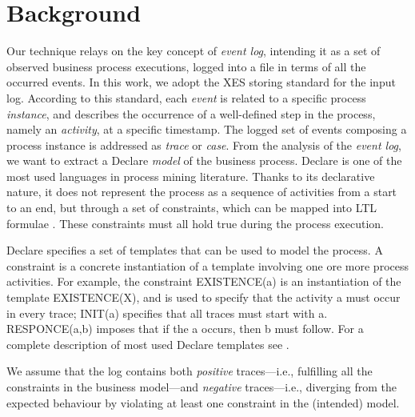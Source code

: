 \section{Background}%
\label{sec:back}

Our technique relays on the key concept of \emph{event log}, intending it as a set of observed business process executions, logged into a file in terms of all the occurred events. In this work, we adopt the \ac{XES} storing standard \cite{XES} for the input log. According to this standard, each \emph{event} is related to a specific process \emph{instance}, and describes the occurrence of a well-defined step in the process, namely an \emph{activity}, at a specific timestamp. The logged set of events composing a process instance is addressed as \emph{trace} or \emph{case}. 
From the analysis of the \emph{event log}, we want to extract a Declare \cite{2008-Pesic,2009-Aalst} \emph{model} of the business process.
Declare is one of the most used languages in process mining literature. Thanks to its declarative nature, it does not represent the process as a sequence of activities from a start to an end, but through a set of constraints, which can be mapped into \ac{LTL} formulae \cite{?}. These constraints must all hold true during the process execution.

Declare specifies a set of templates that can be used to model the process. 
A constraint is a concrete instantiation of a template involving one ore more process activities.
For example, the constraint \textsf{EXISTENCE(a)} is an instantiation of the template \textsf{EXISTENCE(X)}, and is used to specify that the activity \textsf{a} must occur in every trace; \textsf{INIT(a)} specifies that all traces must start with \textsf{a}. \textsf{RESPONCE(a,b)} imposes that if the \textsf{a} occurs, then \textsf{b} must follow. %
For a complete description of most used Declare templates see \cite{2008-Pesic}. 

We assume that the log contains both \emph{positive} traces---i.e., fulfilling all the constraints in the business model---and \emph{negative} traces---i.e., diverging from the expected behaviour by violating at least one constraint in the (intended) model. 



